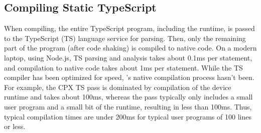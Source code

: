 


\subsection{Compiling Static TypeScript}

When compiling, the entire TypeScript program, including the runtime, is
passed to the TypeScript (TS) language service for parsing. Then, only the remaining part of the program (after code shaking) is compiled to native code.
On a modern laptop, using Node.js, TS parsing and analysis takes about 0.1ms per statement, and \MC compilation to native code takes about 1ms per statement.
While the TS compiler has been optimized for speed, \MCN's native compilation process hasn't been. For example, the CPX TS pass is dominated by compilation of the device runtime and takes about 100ms, whereas the \MC pass typically only includes a small user program and a small bit of the runtime, resulting in less than 100ms. Thus, typical compilation times are under 200ms for typical user programs of 100 lines or less.





